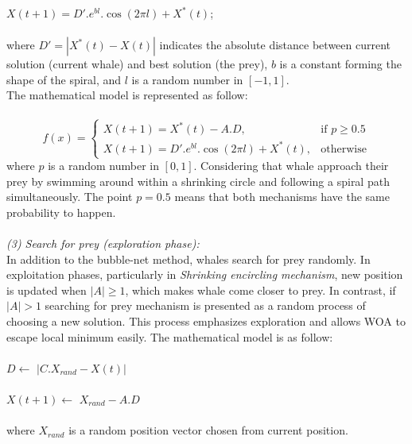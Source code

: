 \documentclass[a4paper]{article}
\begin{document}
$X(t+1) = D'.e^{bl}.\cos(2\pi l) + X^*(t)$; \\ \\
where $D' = |X^*(t) - X(t)|$ indicates the absolute distance between current solution (current whale) and best solution (the prey), $b$ is a constant forming the shape of the spiral, and $l$ is a random number in $[-1,1]$. \\
The mathematical model is represented as follow: \\ \\
\[
    f(x)= 
\begin{cases}
    X(t+1) = X^*(t) - A.D,& \text{if } p\geq 0.5\\
    X(t+1) = D'.e^{bl}.\cos(2\pi l) + X^*(t),              & \text{otherwise}
\end{cases}
\]
where $p$ is a random number in $[0,1]$. Considering that whale approach their prey by swimming around within a shrinking circle and following a spiral path simultaneously. The point $p = 0.5$ means that both mechanisms have the same probability to happen. \\ \\
\textit{(3) Search for prey (exploration phase):} \\
In addition to the bubble-net method, whales search for prey randomly. In exploitation phases, particularly in \textit{Shrinking encircling mechanism}, new position is updated when $|A|\geq 1$, which makes whale come closer to prey. In contrast, if $|A| > 1$ searching for prey mechanism is presented as a random process of choosing a new solution. This process emphasizes exploration and allows WOA to escape local minimum easily. The mathematical model is as follow: \\ \\
$D \gets$ $|C.X_{rand} - X(t)|$ \\ \\
$X(t+1) \gets$ $X_{rand} - A.D$ \\ \\
where $X_{rand}$ is a random position vector chosen from current position. \\ \\
\end{document}
